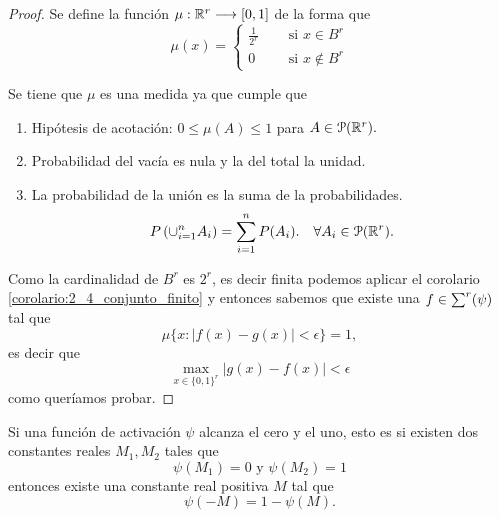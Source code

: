 \begin{proof}
    Se define la función $\mu : \mathbb{R}^r \longrightarrow [0,1]$ de la forma que 
    \begin{equation}
        \mu(x) = 
      \left \{
    \begin{aligned}
      \frac{1}{2^r} \quad &\text{ si } x \in B^r \\
      0 \quad & \text{ si } x \notin B^r 
    \end{aligned}
  \right .
    \end{equation}

    Se tiene que $\mu$ es una medida ya que cumple que 
    \begin{enumerate}
        \item Hipótesis de acotación: $0 \leq \mu(A) \leq 1$ para $A \in \mathcal{P}(\mathbb{R}^r).$
        \item Probabilidad del vacía es nula y la del  total la unidad. 
        \item La probabilidad de la unión es la suma de la probabilidades. 
        \begin{equation}
            P\left(
                \cup_{i=1}^n A_i
            \right)
            = \sum_{i=1}^n P(A_i).
            \quad
            \forall A_i \in  \mathcal{P}(\mathbb{R}^r).
        \end{equation}
    \end{enumerate}  

    Como la cardinalidad de $B^r$ es $2^r$, es decir finita
    podemos aplicar el corolario \ref{corolario:2_4_conjunto_finito}
    y entonces sabemos que  existe una $f\in \sum^r (\psi)$ tal que 
    \begin{equation}
            \mu\{ 
                x:
                |f(x) - g(x)| 
                < \epsilon
            \}
            = 1,
    \end{equation} 
    es decir que 
    \begin{equation}
        \max_{x \in \{ 0,1\}^r} |g(x) - f(x)|
        < \epsilon
    \end{equation}
    como queríamos probar. 
\end{proof}
\begin{lema}
    Si una función de activación  $\psi$ alcanza el cero y el uno, esto es 
    si existen dos constantes reales $M_1, M_2$ 
    tales que 
    \begin{equation}
        \psi(M_1) = 0 \text{ y } \psi(M_2)=1
    \end{equation}
    entonces existe una constante real positiva $M$ tal que 
    \begin{equation}
        \psi(-M) = 1- \psi(M).
    \end{equation}
\end{lema}
